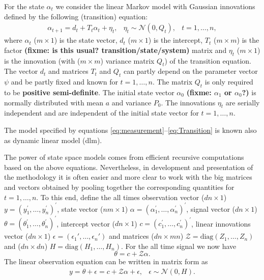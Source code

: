 \documentclass{article}
\begin{document}
For the state $\alpha_t$ we consider the linear Markov model with Gaussian innovations
defined by the following (transition) equation:
\begin{equation}
  \begin{array}{rccl}
    \alpha_{t+1}  =  d_t + T_t \alpha_t + \eta_t, & \eta_t \sim \mathcal{N}(0,Q_t),
    & t=1,\dots,n,
  \end{array}
  \label{eq:Transition}
\end{equation}
where $\alpha_t$ ($m \times 1$) is the state vector, $d_t$ ($m \times 1$) is the intercept,
$T_t$ ($m \times m$) is the factor
\textbf{(fixme: is this usual?  transition/state/system)}
matrix and $\eta_t$ ($m \times 1$) is the innovation (with ($m \times m$) variance matrix
$Q_t$) of the transition equation. The vector $d_t$ and matrices $T_t$ and $Q_t$ can partly
depend on the parameter vector $\psi$ and be partly fixed and known for $t=1,\dots, n$. The
matrix $Q_t$ is only required to be \textbf{positive semi-definite}. The initial state vector
$\alpha_{0}$ \textbf{(fixme: $\alpha_{1}$ or $\alpha_{0}$?)}
is normally distributed with mean $a$ and variance $P_{0}$. The innovations $\eta_t$ are
serially independent and are independent of the initial state vector for $t=1,\dots, n$.




The model specified by equations \eqref{eq:measurement}--\eqref{eq:Transition} is known also
as dynamic linear model (dlm).

The power of state space models comes from efficient recursive computations based on the above
equations. Nevertheless, in development and presentation of the methodology it is often easier
and more clear to work with the big matrices and vectors obtained by pooling together the
corresponding quantities for $t=1,\dots,n$.
To this end, define
the all times
observation vector ($dn \times 1$) $y=(y_1^\prime,\dots,y_n^\prime)^\prime$,
state vector ($ nm \times 1 $) $\alpha=(\alpha_1^\prime,\dots,\alpha_n^\prime)^\prime$,
signal vector ($dn \times 1$) $\theta=(\theta_1^\prime,\dots,\theta_n^\prime)^\prime$,
intercept vector ($dn \times 1$) $c=(c_1^\prime,\dots,c_n^\prime)^\prime$,
linear innovations vector ($dn \times 1$) $\epsilon = (\epsilon_{1}',\dots,\epsilon_{n}')$
and
matrices ($dn \times mn$) $\mathcal{Z}= \text{diag}(Z_1,\dots,Z_n)$
and ($dn \times dn$)  $H=\text{diag}(H_1,\dots,H_n)$.
For the all time signal we now have
\begin{equation*}
  \theta = c + \mathcal{Z} \alpha
  .
\end{equation*}
The linear observation equation can be written in matrix form as
\begin{equation}
  \begin{array}{rcl}
    y = \theta + \epsilon
      =  c + \mathcal{Z} \alpha + \epsilon
      , & \epsilon \sim \mathcal{N}(0,H) %
    .
  \end{array}
  \label{eq:measurementVec}
\end{equation}
\end{document}
